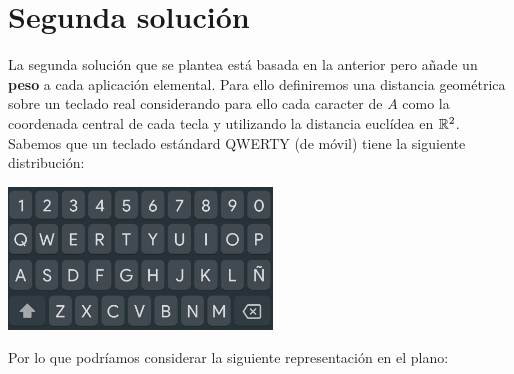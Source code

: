 \documentclass[12pt]{article}
\begin{document}
\section{Segunda solución}

La segunda solución que se plantea está basada en la anterior pero añade un \textbf{peso} a cada aplicación elemental. Para ello definiremos una distancia geométrica sobre un teclado real considerando para ello cada caracter de $A$ como la coordenada central de cada tecla y utilizando la distancia euclídea en $\mathbb{R}^2$.
Sabemos que un teclado estándard QWERTY (de móvil) tiene la siguiente distribución:

\begin{center}
    \includegraphics[width=7cm]{teclado.png}
\end{center}

Por lo que podríamos considerar la siguiente representación en el plano:
\vspace*{0.5cm}

\end{document}
